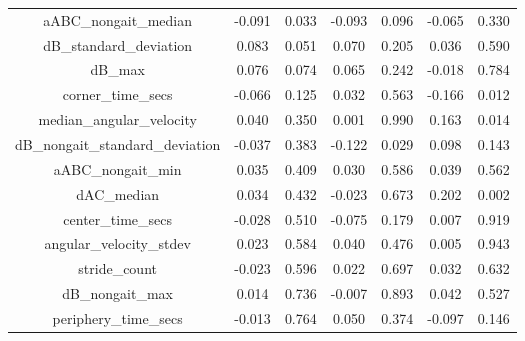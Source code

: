 \documentclass[11pt,reqno]{amsart}
\begin{document}
\begin{longtable}[c]{|c|c|c|c|c|c|c|}
aABC\_nongait\_median                     & -0.091   & 0.033   & -0.093 & 0.096   & -0.065  & 0.330  \\
dB\_standard\_deviation                   & 0.083    & 0.051   & 0.070  & 0.205   & 0.036   & 0.590  \\
dB\_max                                   & 0.076    & 0.074   & 0.065  & 0.242   & -0.018  & 0.784  \\
corner\_time\_secs                        & -0.066   & 0.125   & 0.032  & 0.563   & -0.166  & 0.012  \\
median\_angular\_velocity                 & 0.040    & 0.350   & 0.001  & 0.990   & 0.163   & 0.014  \\
dB\_nongait\_standard\_deviation          & -0.037   & 0.383   & -0.122 & 0.029   & 0.098   & 0.143  \\
aABC\_nongait\_min                        & 0.035    & 0.409   & 0.030  & 0.586   & 0.039   & 0.562  \\
dAC\_median                               & 0.034    & 0.432   & -0.023 & 0.673   & 0.202   & 0.002  \\
center\_time\_secs                        & -0.028   & 0.510   & -0.075 & 0.179   & 0.007   & 0.919  \\
angular\_velocity\_stdev                  & 0.023    & 0.584   & 0.040  & 0.476   & 0.005   & 0.943  \\
stride\_count                             & -0.023   & 0.596   & 0.022  & 0.697   & 0.032   & 0.632  \\
dB\_nongait\_max                          & 0.014    & 0.736   & -0.007 & 0.893   & 0.042   & 0.527  \\
periphery\_time\_secs                     & -0.013   & 0.764   & 0.050  & 0.374   & -0.097  & 0.146 



\end{longtable}
\end{document}
